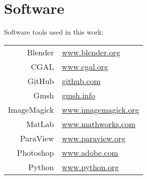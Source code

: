 \documentclass[a4paper,10pt]{article}
\begin{document}
\section{Software}
Software tools used in this work:
\begin{table}[H]
\begin{tabular}{rl}
Blender &\url{www.blender.org}\\
CGAL &\url{www.cgal.org}\\
GitHub &\url{github.com}\\
Gmsh &\url{gmsh.info}\\
ImageMagick &\url{www.imagemagick.org}\\
MatLab &\url{www.mathworks.com}\\
ParaView &\url{www.paraview.org}\\
Photoshop &\url{www.adobe.com}\\
Python &\url{www.python.org}\\
\end{tabular}
\end{table}
\end{document}
